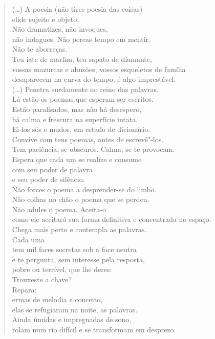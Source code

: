 \begin{verse}
(\ldots{}) A poesia (não tires poesia das coisas) \\
elide sujeito e objeto. \\[8pt]
Não dramatizes, não invoques, \\
não indagues. Não percas tempo em mentir. \\
Não te aborreças. \\
Teu iate de marfim, teu sapato de diamante, \\
vossas mazurcas e abusões, vossos \qb{}esqueletos de família \\
desaparecem na curva do tempo, é algo \qb{}imprestável. \\[8pt]
(\ldots{}) Penetra surdamente no reino das \qb{}palavras. \\
Lá estão os poemas que esperam ser escritos. \\
Estão paralisados, mas não há desespero, \\
há calma e frescura na superfície intata. \\
Ei-los sós e mudos, em estado de dicionário. \\
Convive com teus poemas, antes de \qb{}escrevê"-los. \\
Tem paciência, se obscuros. Calma, se te \qb{}provocam. \\
Espera que cada um se realize e consume \\
com seu poder de palavra \\
e seu poder de silêncio. \\
Não forces o poema a desprender-se \qb{}do limbo. \\
Não colhas no chão o poema que se perdeu. \\
Não adules o poema. Aceita-o \\
como ele aceitará sua forma definitiva e \qb{}concentrada no espaço. \\[8pt]
Chega mais perto e contempla as palavras. \\
Cada uma \\
tem mil faces secretas sob a face neutra \\
e te pergunta, sem interesse pela resposta, \\
pobre ou terrível, que lhe deres: \\
Trouxeste a chave? \\[8pt]
Repara: \\
ermas de melodia e conceito, \\
elas se refugiaram na noite, as palavras. \\
Ainda úmidas e impregnadas de sono, \\
rolam num rio difícil e se transformam \qb{}em desprezo.
\end{verse}

